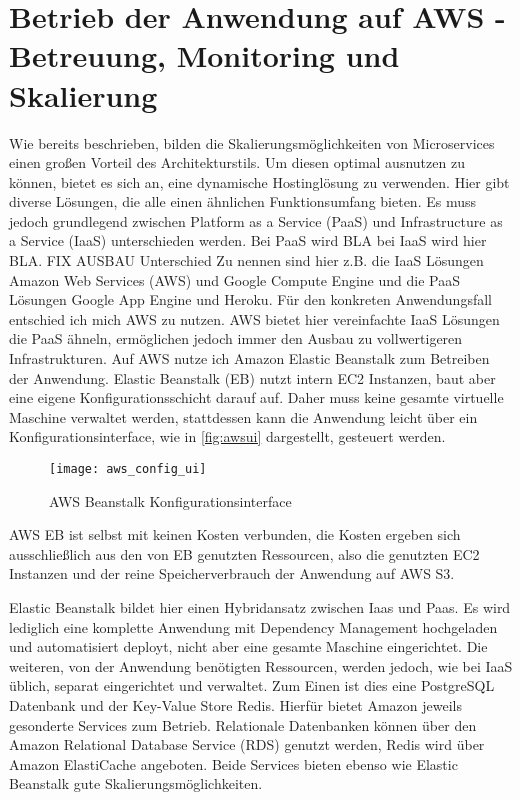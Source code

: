 \section{Betrieb der Anwendung auf AWS - Betreuung, Monitoring und Skalierung}
Wie bereits beschrieben, bilden die Skalierungsmöglichkeiten von Microservices einen großen Vorteil des Architekturstils. Um diesen optimal ausnutzen zu können, bietet es sich an, eine dynamische Hostinglösung zu verwenden. Hier gibt diverse Lösungen, die alle einen ähnlichen Funktionsumfang bieten. Es muss jedoch grundlegend zwischen Platform as a Service (PaaS) und Infrastructure as a Service (IaaS) unterschieden werden. 
Bei PaaS wird BLA bei IaaS wird hier BLA. FIX AUSBAU Unterschied
Zu nennen sind hier z.B. die IaaS Lösungen Amazon Web Services (AWS) und Google Compute Engine\cite{googlecompute} und die PaaS Lösungen Google App Engine\cite{googleapp} und Heroku\cite{heroku}.
Für den konkreten Anwendungsfall entschied ich mich AWS zu nutzen. AWS bietet hier vereinfachte IaaS Lösungen die PaaS ähneln, ermöglichen jedoch immer den Ausbau zu vollwertigeren Infrastrukturen.
Auf AWS nutze ich Amazon Elastic Beanstalk\cite{aws:beanstalk} zum Betreiben der Anwendung. Elastic Beanstalk (EB) nutzt intern EC2 Instanzen, baut aber eine eigene Konfigurationsschicht darauf auf. Daher muss keine gesamte virtuelle Maschine verwaltet werden, stattdessen kann die Anwendung leicht über ein Konfigurationsinterface, wie in \autoref{fig:awsui} dargestellt, gesteuert werden.

\begin{figure}[!ht]
    \centering
    \caption{AWS Beanstalk Konfigurationsinterface}
    \label{fig:awsui}
    \texttt{[image: aws\_config\_ui]}
\end{figure}
AWS EB ist selbst mit keinen Kosten verbunden, die Kosten ergeben sich ausschließlich aus den von EB genutzten Ressourcen, also die genutzten EC2 Instanzen und der reine Speicherverbrauch der Anwendung auf AWS S3. 

Elastic Beanstalk bildet hier einen Hybridansatz zwischen Iaas und Paas. Es wird lediglich eine komplette Anwendung mit Dependency Management hochgeladen und automatisiert deployt, nicht aber eine gesamte Maschine eingerichtet.
Die weiteren, von der Anwendung benötigten Ressourcen, werden jedoch, wie bei IaaS üblich, separat eingerichtet und verwaltet. Zum Einen ist dies eine PostgreSQL Datenbank und der Key-Value Store Redis. Hierfür bietet Amazon jeweils gesonderte Services zum Betrieb. Relationale Datenbanken können über den Amazon Relational Database Service (RDS)\cite{aws:rds} genutzt werden, Redis wird über Amazon ElastiCache\cite{aws:elasticache} angeboten. Beide Services bieten ebenso wie Elastic Beanstalk gute Skalierungsmöglichkeiten.

